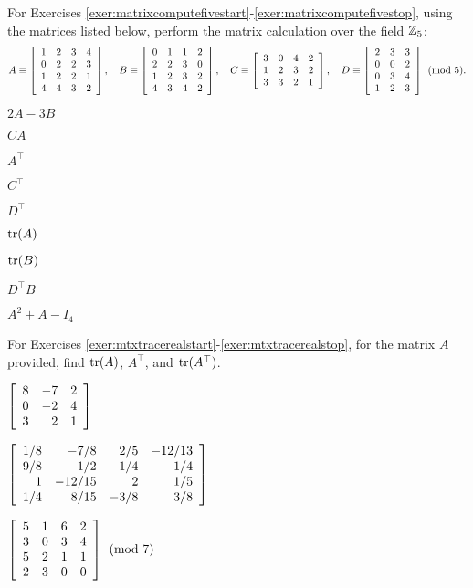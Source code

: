 \noindent For Exercises \ref{exer:matrixcomputefivestart}-\ref{exer:matrixcomputefivestop}, using the matrices listed below, perform the matrix calculation over the field $\Z_5$:
\[A \equiv \mtx{rrrr}{1&2&3&4\\0&2&2&3\\1&2&2&1\\4&4&3&2},\quad B \equiv \mtx{rrrr}{0&1&1&2\\2&2&3&0\\1&2&3&2\\4&3&4&2}, \quad C \equiv \mtx{rrrr}{3&0&4&2\\1&2&3&2\\3&3&2&1},\quad D\equiv\mtx{rrr}{2&3&3\\0&0&2\\0&3&4\\1&2&3} \pmod 5.\]
\begin{enumerate}[!HW!, label=$\spadesuit$ \arabic*., ref=\arabic*]
\begin{multicols}{5}
\item\label{exer:matrixcomputefivestart} $2A-3B$
\item $CA$
\item $A^\top $ 
\item $C^\top $
\item $D^\top $
\end{multicols}
\begin{multicols}{4}
\item $\tr(A)$
\item $\tr(B)$
\item $D^\top B$
\item\label{exer:matrixcomputefivestop} $A^2+A-I_4$
\end{multicols}
\end{enumerate}

\noindent For Exercises \ref{exer:mtxtracerealstart}-\ref{exer:mtxtracerealstop}, for the matrix $A$ provided, find $\tr(A)$, $A^\top $, and $\tr(A^\top )$.
\begin{enumerate}[!HW!]
\begin{multicols}{4}
\item\label{exer:mtxtracerealstart} $\mtx{rrr}{8&-7&2\\0&-2&4\\3&2&1}$ %
\item $\mtx{rrrr}{1/8&-7/8&2/5&-12/13\\9/8&-1/2&1/4&1/4\\1&-12/15&2&1/5\\1/4&8/15&-3/8&3/8}$ %

\mbox{}

\item\label{exer:mtxtracerealstop} \mbox{$\mtx{rrrr}{5&1&6&2\\3&0&3&4\\5&2&1&1\\2&3&0&0}\pmod 7$} %
\end{multicols}
\end{enumerate}

